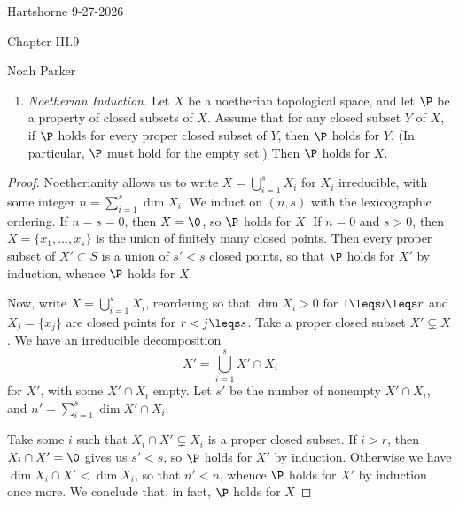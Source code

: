 \documentclass[12pt]{amsart}
\begin{document}
{Hartshorne} \hfill {9-27-2026}

\bigskip\bigskip

\begin{center}

{\sc Chapter III.9}

\end{center}

\begin{center}

  {Noah Parker} 
    
\end{center}

\bigskip\bigskip


\begin{enumerate}
  \item[II.3.16.] {
      \emph{Noetherian Induction.}
      Let $X$ be a noetherian topological space, and let $\P$ be a property of closed subsets of $X$.
      Assume that for any closed subset $Y$ of $X$, if $\P$ holds for every proper closed subset of $Y$, then $\P$ holds for $Y$. 
      (In particular, $\P$ must hold for the empty set.)
      Then $\P$ holds for $X$.
    }
\end{enumerate}

\begin{proof}
  Noetherianity allows us to write $X=\bigcup_{i=1}^s X_i$ for $X_i$ irreducible, with some integer $n=\sum_{i=1}^s \dim X_i$.
  We induct on $(n,s)$ with the lexicographic ordering.
  If $n=s=0$, then $X=\0$, so $\P$ holds for $X$.
  If $n=0$ and $s>0$, then $X = \{x_1,\ldots, x_s\}$ is the union of finitely many closed points.
  Then every proper subset of $X'\subset S$ is a union of $s'<s$ closed points, so that $\P$ holds for $X'$ by induction, whence $\P$ holds for $X$.

  Now, write $X = \bigcup_{i=1}^s X_i$, reordering so that $\dim X_i>0$ for $1\leqs i\leqs r$ and $X_j = \{x_j\}$ are closed points for $r<j\leqs s$.
  Take a proper closed subset $X'\subsetneq X$.
  We have an irreducible decomposition
  \[
    X' = \bigcup_{i=1}^{s} X'\cap X_i
  \] 
  for $X'$, with some $X'\cap X_i$ empty.
  Let $s'$ be the number of nonempty $X'\cap X_i$, and $n'=\sum_{i=1}^s \dim X'\cap X_i$.

  Take some $i$ such that $X_i\cap X'\subsetneq X_i$ is a proper closed subset.
  If $i>r$, then $X_i\cap X'=\0$ gives us $s'<s$, so $\P$ holds for $X'$ by induction.
  Otherwise we have $\dim X_i\cap X'<\dim X_i$, so that $n'<n$, whence $\P$ holds for $X'$ by induction once more.
  We conclude that, in fact, $\P$ holds for $X$
\end{proof}
\end{document}
